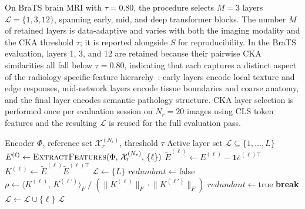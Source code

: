 \documentclass[lettersize,journal]{IEEEtran}
\begin{document}
On BraTS brain MRI with $\tau = 0.80$, the procedure selects
$M = 3$ layers $\mathcal{L} = \{1, 3, 12\}$, spanning early, mid, and
deep transformer blocks.
The number $M$ of retained layers is data-adaptive and varies with both
the imaging modality and the CKA threshold $\tau$; it is reported
alongside $S$ for reproducibility.
In the BraTS evaluation, layers 1, 3, and 12 are retained because their
pairwise CKA similarities all fall below $\tau = 0.80$, indicating that
each captures a distinct aspect of the radiology-specific feature
hierarchy~\cite{dosovitskiy2020vit,oquab2023dinov2}: early layers encode local texture and edge responses,
mid-network layers encode tissue boundaries and coarse anatomy, and
the final layer encodes semantic pathology structure.
CKA layer selection is performed once per evaluation session on
$N_r = 20$ images using CLS token features and the resulting $\mathcal{L}$
is reused for the full evaluation pass.

\begin{algorithm}[t]
\caption{CKA-based greedy layer selection ($\textsc{CKAPrune}$)}
\label{alg:cka_pruning}
\begin{algorithmic}[1]
\Require Encoder $\Phi$, reference set $\mathcal{X}_r^{(N_r)}$,
         threshold $\tau$
\Ensure  Active layer set $\mathcal{L} \subseteq \{1,\ldots,L\}$
  \State $E^{(\ell)} \leftarrow
         \textsc{ExtractFeatures}(\Phi,\,
         \mathcal{X}_r^{(N_r)},\, \{\ell\})$
  \State $\tilde{E}^{(\ell)} \leftarrow
         E^{(\ell)} - \mathbf{1}\bar{e}^{(\ell)\top}$
  \State $K^{(\ell)} \leftarrow
         \tilde{E}^{(\ell)}\tilde{E}^{(\ell)\top}$
\EndFor
\State $\mathcal{L} \leftarrow \{L\}$
  \State $\mathit{redundant} \leftarrow \mathrm{false}$
    \State $\rho \leftarrow
           \langle K^{(\ell)},\, K^{(\ell')} \rangle_F \;/\;
           (\lVert K^{(\ell)} \rVert_F \cdot
            \lVert K^{(\ell')} \rVert_F)$
    \If{$\rho > \tau$}
      \State $\mathit{redundant} \leftarrow \mathrm{true}$
      \State \textbf{break}
    \EndIf
  \EndFor
    \State $\mathcal{L} \leftarrow \mathcal{L} \cup \{\ell\}$
  \EndIf
\EndFor
\State \Return $\mathcal{L}$
\end{algorithmic}
\end{algorithm}







\vfill
\end{document}
